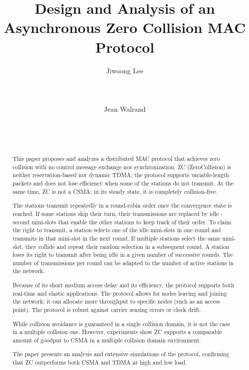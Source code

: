 \documentclass{acm_proc_article-sp}
\begin{document}
\title{Design and Analysis of an Asynchronous Zero Collision MAC Protocol}
\author{
\alignauthor
Jiwoong Lee\\
       \\
       \\
       \\
\alignauthor
Jean Walrand\\
       \\
       \\
       \\
}

\maketitle
\begin{abstract}
This paper proposes and analyzes a distributed MAC protocol that achieves zero collision with no control message exchange nor synchronization. ZC (ZeroCollision) is neither reservation-based nor dynamic TDMA; the protocol supports variable-length packets and does not lose efficiency when some of the stations do not transmit. At the same time, ZC is not a CSMA; in its steady state, it is completely collision-free.

The stations transmit repeatedly in a round-robin order once the convergence state is reached. If some stations skip their turn, their transmissions are replaced by idle -second mini-slots that enable the other stations to keep track of their order. To claim the right to transmit, a station selects one of the idle mini-slots in one round and transmits in that mini-slot in the next round. If multiple stations select the same mini-slot, they collide and repeat their random selection in a subsequent round.  A station loses its right to transmit after being idle in a given number of successive rounds. The number of transmissions per round can be adapted to the number of active stations in the network.

Because of its short medium access delay  and its efficiency, the protocol supports both real-time and elastic applications. The protocol allows for nodes leaving and joining the network; it can allocate more throughput to specific nodes (such as an access point). The protocol is robust against carrier sensing errors or clock drift.

While collision avoidance is guaranteed in a single collision domain, it is not the case in a multiple collision one. However, experiments show ZC supports a comparable amount of goodput to CSMA in a multiple collision domain environment.

The paper presents an analysis and extensive simulations of the protocol, confirming that ZC outperforms both CSMA and TDMA at high and low load.


\end{abstract}
\end{document}
